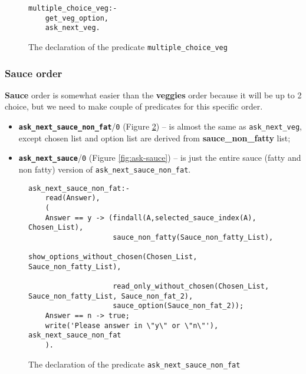 \documentclass[12pt,a4paper]{article}
\newcommand{\varname}[1]{\texttt{#1}}
\newcommand{\varnamebf}[1]{\textbf{\texttt{#1}}}
\newcommand{\predprot}[2]{{\color{MidnightBlue}\varnamebf{#1}}/{\color{Mulberry}\varname{#2}}}
\newcommand{\predname}[1]{{\color{MidnightBlue}\varname{#1}}}
\begin{document}
\begin{figure}[H]
	\centering
\begin{lstlisting}[style=Prolog-pygsty]
% Define multiple_choice_veg
multiple_choice_veg:-
    get_veg_option,
    ask_next_veg.
\end{lstlisting}
	\caption{The declaration of the predicate \predname{multiple\_choice\_veg}} 
	\label{fig:multiple-choice-veg}
\end{figure}

\subsubsection{Sauce order}
\label{sec:sauce-order}

\textbf{Sauce} order is somewhat easier than the \textbf{veggies} order because it will be up to 2 choice, but we need to make couple of predicates for this specific order.\\ 


\begin{itemize}
    \item \predprot{ask\_next\_sauce\_non\_fat}{0} (Figure \ref{fig:ask-sauce-nonfat}) -- is almost the same as \predname{ask\_next\_veg}, except chosen list and option list are derived from \textbf{sauce\_non\_fatty} list;
    
    \item \predprot{ask\_next\_sauce}{0} (Figure \ref{fig:ask-sauce}) -- is just the entire sauce (fatty and non fatty) version of \predname{ask\_next\_sauce\_non\_fat}.
\end{itemize}


\begin{figure}[H]
	\centering
\begin{lstlisting}[style=Prolog-pygsty]
% Define ask_next_sauce_non_fat
ask_next_sauce_non_fat:-
	read(Answer),
    (
	Answer == y -> (findall(A,selected_sauce_index(A), Chosen_List),
                    sauce_non_fatty(Sauce_non_fatty_List),
                    show_options_without_chosen(Chosen_List, Sauce_non_fatty_List),
                     
                    read_only_without_chosen(Chosen_List, Sauce_non_fatty_List, Sauce_non_fat_2),
                    sauce_option(Sauce_non_fat_2));
	Answer == n -> true;
	write('Please answer in \"y\" or \"n\"'), ask_next_sauce_non_fat
    ).
\end{lstlisting}
	\caption{The declaration of the predicate \predname{ask\_next\_sauce\_non\_fat}} 
	\label{fig:ask-sauce-nonfat}
\end{figure}
\end{document}
